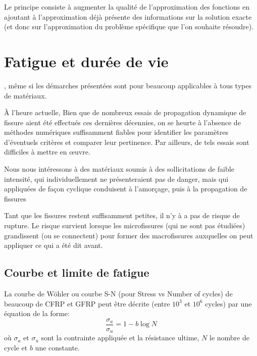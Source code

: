 Le principe consiste à augmenter la qualité de l'approximation des fonctions en ajoutant
à l'approximation déjà présente des informations sur la solution exacte (et donc sur
l'approximation du problème spécifique que l'on souhaite résoudre).







\medskip
\section{Fatigue et durée de vie}

\medskip
{},
même si les démarches présentées sont pour beaucoup applicables à tous types
de matériaux.

\medskip
À l'heure actuelle, 
Bien que de nombreux essais de propagation dynamique de fissure aient été effectués
ces dernières décennies, on se heurte à  l'absence de méthodes numériques suffisamment
fiables pour identifier les paramètres d'éventuels critères et comparer leur pertinence.
Par ailleurs, de tels essais sont difficiles à mettre en œuvre.

\medskip
Nous nous intéressons à des matériaux soumis à des sollicitations de faible intensité,
qui individuellement ne présenteraient pas de danger, mais qui appliquées de façon cyclique
conduisent à l'amorçage, puis à la propagation de fissures

Tant que les fissures restent suffisamment petites, il n'y à a pas de risque de rupture.
Le risque survient lorsque les microfissures (qui ne sont pas étudiées) grandissent (ou
se connectent) pour former des macrofissures auxquelles on peut appliquer ce qui a été dit avant.

\medskip
\subsection{Courbe et limite de fatigue}

La courbe de Wöhler
ou courbe S-N (pour Stress vs Number of cycles) de beaucoup de CFRP et
GFRP peut être décrite (entre $10^3$ et $10^6$ cycles) par une équation de la forme:
\begin{equation}    \dfrac{\sigma_a}{\sigma_u}=1-b\log N \end{equation}
où $\sigma_a$ et $\sigma_u$ sont la contrainte appliquée et la
résistance ultime, $N$ le nombre de cycle et $b$ une constante.

